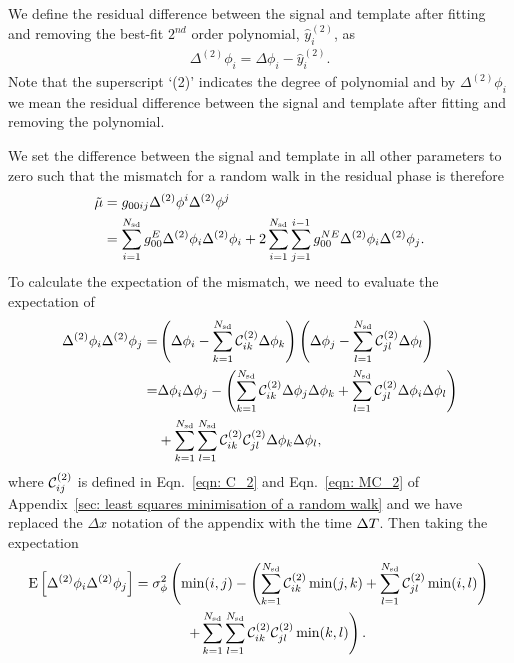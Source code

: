 \documentclass[../full_thesis/full_thesis.tex]{subfiles}
\begin{document}
We define the residual difference between the signal and template
after fitting and removing the best-fit $2^{nd}$ order polynomial, $\hat{y}_i^{(2)}$, as
\begin{align}
\Delta^{(2)}\phi_i = \Delta\phi_i - \hat{y}_i^{(2)}.
\label{eqn: D2phi}
\end{align}
Note that the superscript `(2)' indicates the degree of polynomial and by
$\Delta^{(2)}\phi_i$ we mean the residual difference between the signal and
template after fitting and removing the polynomial.

We set the difference between the signal and template in all other parameters
to zero such that the mismatch for a random walk in the residual phase is
therefore
\begin{align}
\tilde{\mu} & = g_{0 0 i j} \Delta^{(2)}\phi^{i}\Delta^{(2)}\phi^{j} \\
& = \sum_{i=1}^{N_{\textrm{sd}}}g_{00}^{E} \Delta^{(2)}\phi_{i}\Delta^{(2)}\phi_{i}
+ 2 \sum_{i=1}^{N_{\textrm{sd}}}\sum_{j=1}^{i-1}g_{00}^{NE}\Delta^{(2)}\phi_{i}\Delta^{(2)}\phi_{j}.
\label{eqn: 4202540871}
\end{align}
To calculate the expectation of the mismatch, we need to evaluate the
expectation of
\begin{align}
\Delta^{(2)}\phi_{i}\Delta^{(2)}\phi_{j} = & \left(\Delta\phi_{i}
- \sum_{k=1}^{N_{\textrm{sd}}}\mathcal{C}^{(2)}_{ik}\Delta\phi_{k}\right)
 \left(\Delta\phi_{j} - \sum_{l=1}^{N_{\textrm{sd}}}\mathcal{C}^{(2)}_{jl}\Delta\phi_{l}\right) \\
= & \Delta\phi_{i}\Delta\phi_{j} -
\left(\sum_{k=1}^{N_{\textrm{sd}}}\mathcal{C}^{(2)}_{ik} \Delta\phi_{j}\Delta\phi_{k}
+ \sum_{l=1}^{N_{\textrm{sd}}}\mathcal{C}^{(2)}_{jl}\Delta\phi_{i}\Delta\phi_{l}\right) \nonumber \\
& +
\sum_{k=1}^{N_{\textrm{sd}}}\sum_{l=1}^{N_{\textrm{sd}}}\mathcal{C}^{(2)}_{ik}\mathcal{C}^{(2)}_{jl} \Delta\phi_{k}\Delta\phi_{l},
\end{align}
where $\mathcal{C}^{(2)}_{ij}$ is defined in Eqn.~\ref{eqn: C_2} and Eqn.~\ref{eqn: MC_2} of
Appendix~\ref{sec: least squares minimisation of a random walk} and we have
replaced the $\Delta x$ notation of the appendix with the time $\Delta T$. Then
taking the expectation
\begin{align}
\E{\Delta^{(2)}\phi_{i}\Delta^{(2)}\phi_{j}} & =
\sigma^{2}_{\phi} \left(\min(i, j) - \left(\s{k=1}{\Nsd}\CT_{ik} \min(j, k)
+ \s{l=1}{\Nsd}\CT_{jl}\min(i, l) \right)\right. \notag \\
& \hspace{13mm} \left. + \s{k=1}{\Nsd}\s{l=1}{\Nsd}\CT_{ik}\CT_{jl}\min(k, l)\right).
\label{eqn: expected mismatch dP0idP0j_k2}
\end{align}
\end{document}
